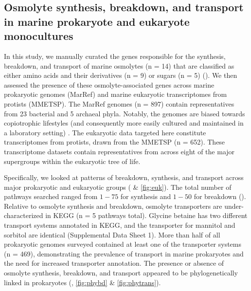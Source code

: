 \documentclass[utf8]{frontiersSCNS} %
\begin{document}
\subsection{Osmolyte synthesis, breakdown, and transport in marine prokaryote and eukaryote monocultures}

In this study, we manually curated the genes responsible for the synthesis, breakdown, and transport of marine osmolytes (n = 14) that are classified as either amino acids and their derivatives (n = 9) or sugars (n = 5) (). We then assessed the presence of these osmolyte-associated genes across marine prokaryotic genomes (MarRef) and marine eukaryotic transcriptomes from protists (MMETSP). The MarRef genomes (n = 897) contain representatives from 23 bacterial and 5 archaeal phyla. Notably, the genomes are biased towards copiotrophic lifestyles (and consequently more easily cultured and maintained in a laboratory setting) \citep{Pachiadaki_2019}. The eukaryotic data targeted here constitute transcriptomes from protists, drawn from the MMETSP (n = 652). These transcriptome datasets contain representatives from across eight of the major supergroups within the eukaryotic tree of life.

Specifically, we looked at patterns of breakdown, synthesis, and transport across major prokaryotic and eukaryotic groups ( \& \ref{fig:euk}). The total number of pathways searched ranged from $1 - 75$ for synthesis and $1 - 50$ for breakdown (). Relative to osmolyte synthesis and breakdown, osmolyte transporters are under-characterized in KEGG (n = 5 pathways total). Glycine betaine has two different transport systems annotated in KEGG, and the transporter for mannitol and sorbitol are identical (Supplemental Data Sheet 1). More than half of all prokaryotic genomes surveyed contained at least one of the transporter systems (n = 469), demonstrating the prevalence of transport in marine prokaryotes and the need for increased transporter annotation. The presence or absence of osmolyte synthesis, breakdown, and transport appeared to be phylogenetically linked in prokaryotes (, \ref{fig:phybd} \& \ref{fig:phytrans}).
\end{document}
